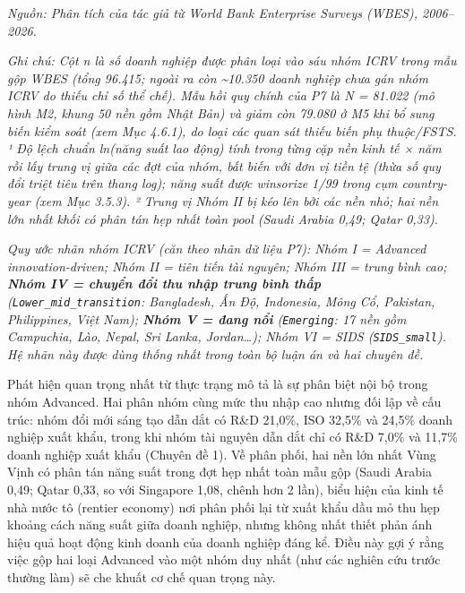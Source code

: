 \documentclass[
  a4paper,
  13pt]{extreport}
\begin{document}
\emph{Nguồn: Phân tích của tác giả từ World Bank Enterprise Surveys
(WBES), 2006--2026.}

\emph{Ghi chú: Cột n là số doanh nghiệp được phân loại vào sáu nhóm ICRV
trong mẫu gộp WBES (tổng 96.415; ngoài ra còn \textasciitilde10.350
doanh nghiệp chưa gán nhóm ICRV do thiếu chỉ số thể chế). Mẫu hồi quy
chính của P7 là N = 81.022 (mô hình M2, khung 50 nền gồm Nhật Bản) và
giảm còn 79.080 ở M5 khi bổ sung biến kiểm soát (xem Mục 4.6.1), do loại
các quan sát thiếu biến phụ thuộc/FSTS. ¹ Độ lệch chuẩn ln(năng suất lao
động) tính trong từng cặp nền kinh tế × năm rồi lấy trung vị giữa các
đợt của nhóm, bất biến với đơn vị tiền tệ (thừa số quy đổi triệt tiêu
trên thang log); năng suất được winsorize 1/99 trong cụm country-year
(xem Mục 3.5.3). ² Trung vị Nhóm II bị kéo lên bởi các nền nhỏ; hai nền
lớn nhất khối có phân tán hẹp nhất toàn pool (Saudi Arabia 0,49; Qatar
0,33).}

\emph{Quy ước nhãn nhóm ICRV (căn theo nhãn dữ liệu P7): Nhóm I =
Advanced innovation-driven; Nhóm II = tiên tiến tài nguyên; Nhóm III =
trung bình cao; \textbf{Nhóm IV = chuyển đổi thu nhập trung bình thấp}
(\texttt{Lower\_mid\_transition}: Bangladesh, Ấn Độ, Indonesia, Mông Cổ,
Pakistan, Philippines, Việt Nam); \textbf{Nhóm V = đang nổi}
(\texttt{Emerging}: 17 nền gồm Campuchia, Lào, Nepal, Sri Lanka,
Jordan\ldots); Nhóm VI = SIDS (\texttt{SIDS\_small}). Hệ nhãn này được
dùng thống nhất trong toàn bộ luận án và hai chuyên đề.}

Phát hiện quan trọng nhất từ thực trạng mô tả là sự phân biệt nội bộ
trong nhóm Advanced. Hai phân nhóm cùng mức thu nhập cao nhưng đối lập
về cấu trúc: nhóm đổi mới sáng tạo dẫn dắt có R\&D 21,0\%, ISO 32,5\% và
24,5\% doanh nghiệp xuất khẩu, trong khi nhóm tài nguyên dẫn dắt chỉ có
R\&D 7,0\% và 11,7\% doanh nghiệp xuất khẩu (Chuyên đề 1). Về phân phối,
hai nền lớn nhất Vùng Vịnh có phân tán năng suất trong đợt hẹp nhất toàn
mẫu gộp (Saudi Arabia 0,49; Qatar 0,33, so với Singapore 1,08, chênh hơn
2 lần), biểu hiện của kinh tế nhà nước tô (rentier economy) nơi phân
phối lại từ xuất khẩu dầu mỏ thu hẹp khoảng cách năng suất giữa doanh
nghiệp, nhưng không nhất thiết phản ánh hiệu quả hoạt động kinh doanh
của doanh nghiệp đáng kể. Điều này gợi ý rằng việc gộp hai loại Advanced
vào một nhóm duy nhất (như các nghiên cứu trước thường làm) sẽ che khuất
cơ chế quan trọng này.
\end{document}
